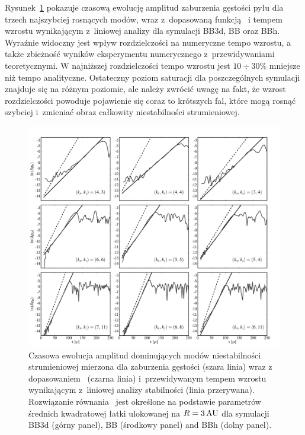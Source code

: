 \par Rysunek~\ref{fig8} pokazuje czasową ewolucję amplitud zaburzenia gęstości
pyłu dla trzech najszybciej rosnących modów, wraz z~dopasowaną funkcją~
i tempem wzrostu wynikającym z~liniowej analizy dla symulacji BB3d, BB oraz BBh.
Wyraźnie widoczny jest wpływ rozdzielczości na numeryczne tempo wzrostu, a także
zbieżność wyników eksperymentu numerycznego z~przewidywaniami teoretycznymi. W
najniższej rozdzielczości tempo wzrostu jest $10\div30\%$ mniejsze niż tempo
analityczne. Ostateczny poziom saturacji dla poszczególnych symulacji znajduje
się na różnym poziomie, ale należy zwrócić uwagę na fakt, że wzrost
rozdzielczości powoduje pojawienie się coraz to krótszych fal, które mogą rosnąć
szybciej i~zmieniać obraz całkowity niestabilności strumieniowej.
 
\begin{figure} \includegraphics[width=0.98\linewidth]{figures/fig8}
   \caption{Czasowa ewolucja amplitud dominujących modów niestabilności
      strumieniowej mierzona dla zaburzenia gęstości (szara linia) wraz z
      dopasowaniem~ (czarna linia) i~przewidywanym tempem wzrostu
      wynikającym z~liniowej analizy stabilności (linia przerywana).
      Rozwiązanie równania~ jest określone na podstawie
      parametrów średnich kwadratowej łatki ulokowanej na $R=3\hbox{$\thinspace\textrm{AU}$}$ dla symulacji
BB3d (górny panel), BB (środkowy panel) and BBh (dolny panel).  } \label{fig8}
\end{figure}

